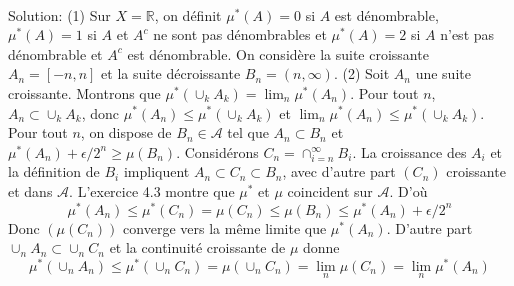\documentclass{report}
\begin{document}
\subsection{}  \\ \\

Solution: (1) Sur $X = \mathbb R$, on définit $\mu^*(A) = 0$ si $A$ est dénombrable, $\mu^*(A) = 1$ si $A$ et $A^c$ ne sont pas dénombrables et $\mu^*(A) = 2$ si $A$ n'est pas dénombrable et $A^c$ est dénombrable. \newline 
On considère la suite croissante $A_n=[-n,n]$ et la suite décroissante $B_n = (n,\infty)$. \newline
(2) Soit $A_n$ une suite croissante. Montrons que $\mu^*(\cup_k A_k) = \lim_n \mu^*(A_n)$. \newline
\fbox{$\geq$} Pour tout $n$, $A_n\subset \cup_k A_k$, donc $\mu^*(A_n) \leq \mu^*(\cup_k A_k)$ et  $\lim_n\mu^*(A_n) \leq \mu^*(\cup_k A_k)$.\newline
\fbox{$\leq$} Pour tout $n$, on dispose de $B_n\in \mathcal A$ tel que $A_n\subset B_n$ et  $\mu^*(A_n)+\epsilon/2^n \geq \mu(B_n)$. Considérons $C_n = \cap_{i=n}^\infty B_i$. La croissance des $A_i$ et la définition de $B_i$ impliquent $A_n\subset C_n \subset B_n$, avec d'autre part $(C_n)$ croissante et dans $\mathcal A$.\newline
L'exercice 4.3 montre que $\mu^*$ et $\mu$ coincident sur $\mathcal A$. D'où $$\mu^*(A_n) \leq \mu^*(C_n) = \mu(C_n) \leq \mu(B_n) \leq \mu^*(A_n)+\epsilon/2^n$$
Donc $(\mu(C_n))$ converge vers la même limite que $\mu^*(A_n)$. \newline
D'autre part $\cup_n A_n\subset \cup_n C_n$ et la continuité croissante de $\mu$ donne 
$$\mu^*(\cup_n A_n)\leq \mu^*(\cup_n C_n)=\mu(\cup_n C_n) = \lim_n \mu(C_n) = \lim_n \mu^*(A_n)$$

\subsection{} \\ \\
\end{document}
